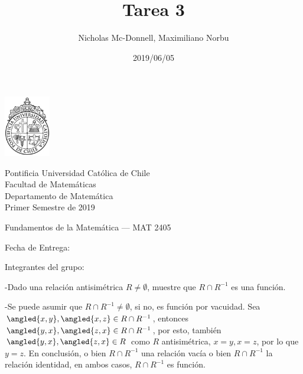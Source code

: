 

\title{Tarea 3}
\author{Nicholas Mc-Donnell, Maximiliano Norbu}
\date{2019/06/05}



\begin{minipage}{2.5cm}
    \includegraphics[width=2cm]{../../figures/logo1.jpg}
\end{minipage}
\begin{minipage}{13cm}
    \begin{flushleft}
        \raggedright{
            \noindent
            {\sc Pontificia Universidad Católica de Chile\\
                Facultad de Matemáticas\\
                Departamento de Matemática} \smallskip \\
            Primer Semestre de 2019\\
        }
    \end{flushleft}
\end{minipage}

\vspace{2ex}
{\Large \centerline{\bf \thetitle}}
{\large \centerline{Fundamentos de la Matemática --- MAT 2405}}
{\normalsize \centerline{ Fecha de Entrega: \thedate}}
\vfill

\begin{flushright}
    {\large Integrantes del grupo:\\
        \theauthor}
\end{flushright}
\newpage
\normalsize
{}
\tableofcontents
\newpage

\begin{prob}
    -Dado una relación antisimétrica \(R\neq\emptyset\), muestre que \(R\cap R^{-1}\) es una función.
\end{prob}

\begin{sol}
    -Se puede asumir que \(R\cap R^{-1}\neq\emptyset\), si no, es función por vacuidad. Sea \(\angled{x,y},\angled{x,z}\in R\cap R^{-1}\), entonces \(\angled{y,x},\angled{z,x}\in R\cap R^{-1}\), por esto, también \(\angled{y,x},\angled{z,x}\in R\) como \(R\)  antisimétrica,  \(x=y,x=z\), por lo que \(y=z\). En conclusión, o bien \(R\cap R^{-1}\) una relación vacía o bien \(R\cap R^{-1}\) la relación identidad, en ambos casos, \(R\cap R^{-1}\) es función.
\end{sol}

